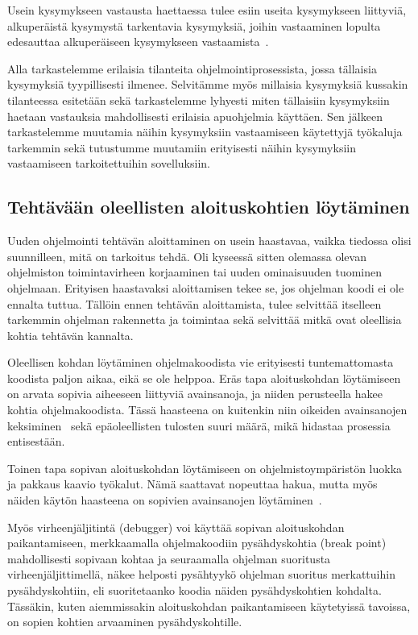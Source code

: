 \documentclass[finnish]{../tktltiki2}
\theoremstyle{definition}
\theoremstyle{remark}
\begin{document}
Usein kysymykseen vastausta haettaessa tulee esiin useita kysymykseen liittyviä, alkuperäistä kysymystä tarkentavia kysymyksiä, joihin vastaaminen lopulta edesauttaa alkuperäiseen kysymykseen vastaamista~\cite{questions-during-software-evolution-tasks}.

Alla tarkastelemme erilaisia tilanteita ohjelmointiprosessista, jossa tällaisia kysymyksiä tyypillisesti ilmenee. Selvitämme myös millaisia kysymyksiä kussakin tilanteessa esitetään sekä tarkastelemme lyhyesti miten tällaisiin kysymyksiin haetaan vastauksia mahdollisesti erilaisia apuohjelmia käyttäen. Sen jälkeen tarkastelemme muutamia näihin kysymyksiin vastaamiseen käytettyjä työkaluja tarkemmin sekä tutustumme muutamiin erityisesti näihin kysymyksiin vastaamiseen tarkoitettuihin sovelluksiin.

\subsection{Tehtävään oleellisten aloituskohtien löytäminen}
Uuden ohjelmointi tehtävän aloittaminen on usein haastavaa, vaikka tiedossa olisi suunnilleen, mitä on tarkoitus tehdä. Oli kyseessä sitten olemassa olevan ohjelmiston toimintavirheen korjaaminen tai uuden ominaisuuden tuominen ohjelmaan. Erityisen haastavaksi aloittamisen tekee se, jos ohjelman koodi ei ole ennalta tuttua. Tällöin ennen tehtävän aloittamista, tulee selvittää itselleen tarkemmin ohjelman rakennetta ja toimintaa sekä selvittää mitkä ovat oleellisia kohtia tehtävän kannalta.

Oleellisen kohdan löytäminen ohjelmakoodista vie erityisesti tuntemattomasta koodista paljon aikaa, eikä se ole helppoa.
Eräs tapa aloituskohdan löytämiseen on arvata sopivia aiheeseen liittyviä avainsanoja, ja niiden perusteella hakee kohtia ohjelmakoodista. Tässä haasteena on kuitenkin niin oikeiden avainsanojen keksiminen~\cite{what-to-search-for} sekä epäoleellisten tulosten suuri määrä, mikä hidastaa prosessia entisestään.

Toinen tapa sopivan aloituskohdan löytämiseen on ohjelmistoympäristön luokka ja pakkaus kaavio työkalut. Nämä saattavat nopeuttaa hakua, mutta myös näiden käytön haasteena on sopivien avainsanojen löytäminen~\cite{what-to-search-for}.

Myös virheenjäljitintä (debugger) voi käyttää sopivan aloituskohdan paikantamiseen, merkkaamalla ohjelmakoodiin pysähdyskohtia (break point) mahdollisesti sopivaan kohtaa ja seuraamalla ohjelman suoritusta virheenjäljittimellä, näkee helposti pysähtyykö ohjelman suoritus merkattuihin pysähdyskohtiin, eli suoritetaanko koodia näiden pysähdyskohtien kohdalta. Tässäkin, kuten aiemmissakin aloituskohdan paikantamiseen käytetyissä tavoissa, on sopien kohtien arvaaminen pysähdyskohtille.
\end{document}
